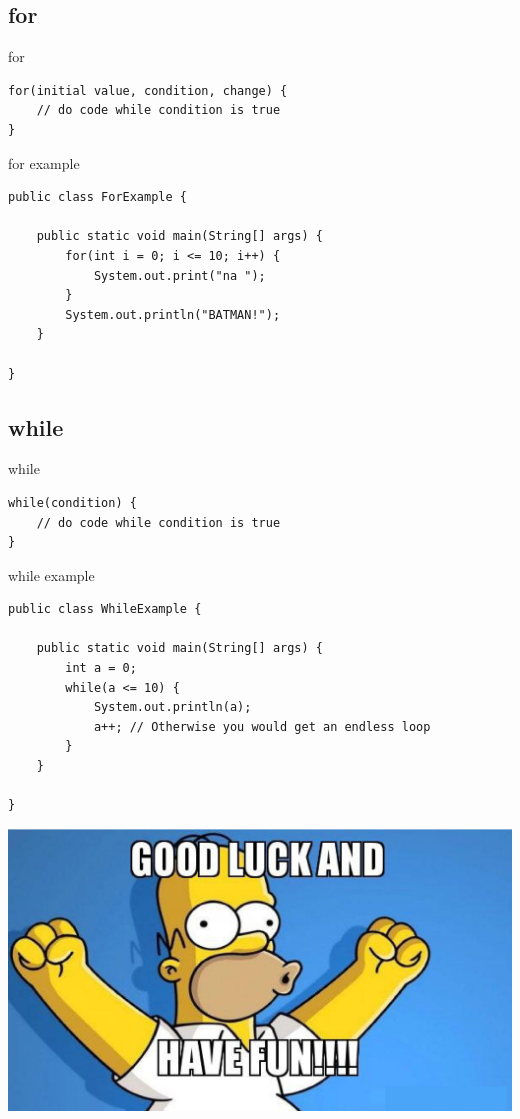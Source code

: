 \subsection{for}
\begin{frame}[fragile]{for}
\begin{lstlisting}
for(initial value, condition, change) {
	// do code while condition is true
}
\end{lstlisting}
\end{frame}

\begin{frame}[fragile]{for example}
\begin{lstlisting}
public class ForExample {

	public static void main(String[] args) {
		for(int i = 0; i <= 10; i++) {
			System.out.print("na ");
		}
		System.out.println("BATMAN!");
	}
    
}
\end{lstlisting}
\end{frame}

\subsection{while}
\begin{frame}[fragile]{while}
\begin{lstlisting}
while(condition) {
	// do code while condition is true
}
\end{lstlisting}
\end{frame}

\begin{frame}[fragile]{while example}
\begin{lstlisting}
public class WhileExample {

	public static void main(String[] args) {
		int a = 0;
		while(a <= 10) {
			System.out.println(a);
            a++; // Otherwise you would get an endless loop
		}
	}
    
}
\end{lstlisting}
\end{frame}


\begin{frame}
	\begin{center}
		\includegraphics[angle=-90, width=\textwidth]{0001}
	\end{center}	

\end{frame}



